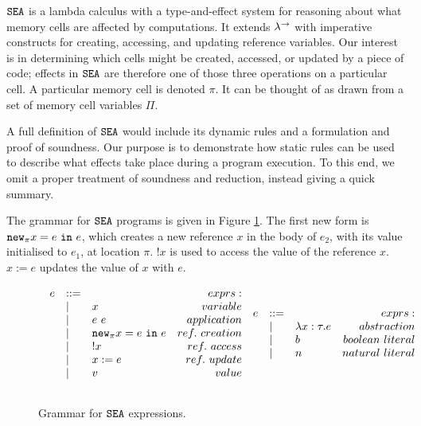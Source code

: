 $\mathtt{SEA}$ is a lambda calculus with a type-and-effect system for reasoning about what memory cells are affected by computations. It extends $\lambda^{\rightarrow}$ with imperative constructs for creating, accessing, and updating reference variables. Our interest is in determining which cells might be created, accessed, or updated by a piece of code; effects in $\mathtt{SEA}$ are therefore one of those three operations on a particular cell. A particular memory cell is denoted $\pi$. It can be thought of as drawn from a set of memory cell variables $\Pi$.

A full definition of $\mathtt{SEA}$ would include its dynamic rules and a formulation and proof of soundness. Our purpose is to demonstrate how static rules can be used to describe what effects take place during a program execution. To this end, we omit a proper treatment of soundness and reduction, instead giving a quick summary.

The grammar for $\mathtt{SEA}$ programs is given in Figure \ref{fig:fx_tute}. The first new form is $\mathtt{new}_{\pi} x = e~\mathtt{in}~ e$, which creates a new reference $x$ in the body of $e_2$, with its value initialised to $e_1$, at location $\pi$. $!x$ is used to access the value of the reference $x$. $x := e$ updates the value of $x$ with $e$.

\begin{figure}[h]

\[
\begin{array}{c}

\begin{array}{lllr}

e & ::= & ~ & exprs: \\
	& | & x & variable \\
	& | & e~e & application \\
	& | & \mathtt{new}_{\pi} x = e~\mathtt{in}~ e & ref.~creation\\
	& | & !x & ref.~access \\
	& | & x := e & ref.~update \\
	& | & v & value \\
	&&\\
	
\end{array}
	
\begin{array}{lllr}


e & ::= & ~ & exprs: \\
	& | & \lambda x: \tau. e & abstraction \\
	& | & b & boolean~literal \\
	& | & n & natural~literal \\
	&&\\
	

\end{array}
	
\end{array}
\]

\vspace{-12pt}
\caption{Grammar for $\mathtt{SEA}$ expressions.}
\label{fig:fx_tute}
\end{figure}

